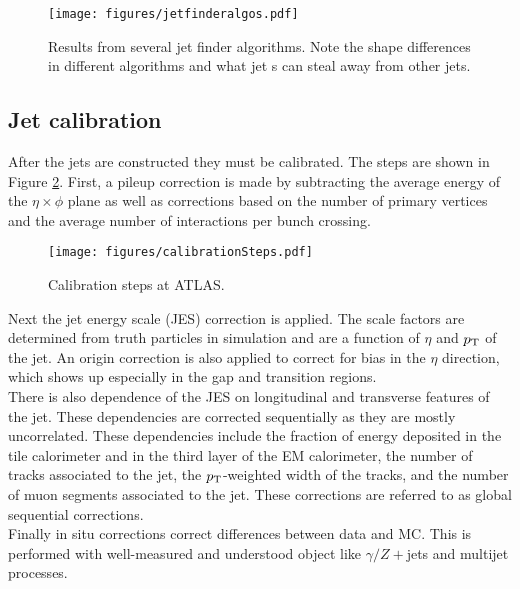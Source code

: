 \begin{figure}[h]
\centering
\texttt{[image: figures/jetfinderalgos.pdf]}
\caption{Results from several jet finder algorithms\cite{antiKt}.  Note the shape differences in different algorithms and what jet \pt s can steal away from other jets.}
\label{fig:ktalgos} 
\end{figure}

\subsection{Jet calibration}

After the jets are constructed they must be calibrated.  The steps are shown in Figure \ref{fig:calsteps}.  First, a pileup correction is made by subtracting the average energy of the $\eta \times \phi$ plane as well as corrections based on the number of primary vertices and the average number of interactions per bunch crossing. \\

\begin{figure}[h]
\centering
\texttt{[image: figures/calibrationSteps.pdf]}
\caption{Calibration steps at ATLAS.}
\label{fig:calsteps} 
\end{figure}

Next the jet energy scale (JES) correction is applied.  The scale factors are determined from truth particles in simulation and are a function of $\eta$ and $p_{\mathrm{T}}$ of the jet.  An origin correction is also applied to correct for bias in the $\eta$ direction, which shows up especially in the gap and transition regions. \\

There is also dependence of the JES on longitudinal and transverse features of the jet.  These dependencies are corrected sequentially as they are mostly uncorrelated.  These dependencies include the fraction of energy deposited in the tile calorimeter and in the third layer of the EM calorimeter, the number of tracks associated to the jet, the $p_{\mathrm{T}}$-weighted width of the tracks, and the number of muon segments associated to the jet.  These corrections are referred to as global sequential corrections. \\

Finally in situ corrections correct differences between data and MC.  This is performed with well-measured and understood object like $\gamma / Z+$jets and multijet processes. \\

